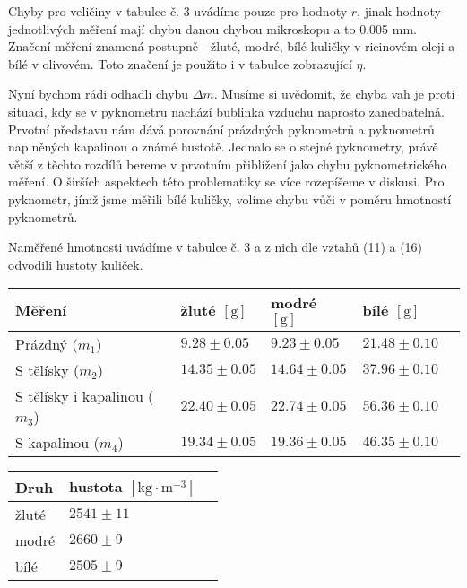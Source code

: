 \documentclass[a4paper]{article}
\begin{document}
\par Chyby pro veličiny v tabulce č. 3 uvádíme pouze pro hodnoty $r$, jinak hodnoty jednotlivých měření mají chybu danou chybou mikroskopu a to 0.005 mm. Značení měření znamená postupně - žluté, modré, bílé kuličky v ricinovém oleji a bílé v olivovém. Toto značení je použito i v tabulce zobrazující $\eta$.
\par Nyní bychom rádi odhadli chybu $\Delta m$. Musíme si uvědomit, že chyba vah je proti situaci, kdy se v pyknometru nachází bublinka vzduchu naprosto zanedbatelná. Prvotní představu nám dává porovnání prázdných pyknometrů a pyknometrů naplněných kapalinou o známé hustotě. Jednalo se o stejné pyknometry, právě větší z těchto rozdílů bereme v prvotním přiblížení jako chybu pyknometrického měření. O širších aspektech této problematiky se více rozepíšeme v diskusi. Pro pyknometr, jímž jsme měřili bílé kuličky, volíme chybu vůči v poměru hmotností pyknometrů.
\par Naměřené hmotnosti uvádíme v tabulce č. 3 a z nich dle vztahů (11) a (16) odvodili hustoty kuliček.
\begin{center}
     \label{tab:title}
    \begin{tabular}{ | l | l | l | l | p{5cm} |} \hline
    Měření & žluté $\mathrm{[g]}$ & modré $\mathrm{[g]}$ & bílé $\mathrm{[g]}$ \\ \hline
    Prázdný ($m_{1}$)     & $9.28\pm0.05$  & $9.23\pm0.05$  & $21.48\pm0.10$ \\ \hline
    S tělísky ($m_{2}$) & $14.35\pm0.05$ & $14.64\pm0.05$ & $37.96\pm0.10$ \\ \hline
    S tělísky i kapalinou ($m_{3}$) & $22.40\pm0.05$ & $22.74\pm0.05$ & $56.36\pm0.10$ \\ \hline
    S kapalinou ($m_{4}$) & $19.34\pm0.05$ & $19.36\pm0.05$ & $46.35\pm0.10$ \\ \hline
    \end{tabular}
\end{center}
\begin{center}
     \label{tab:title}
    \begin{tabular}{ | l | l | p{3cm} |} \hline
    Druh & hustota $\mathrm{[kg \cdot m^{-3}]}$ \\ \hline
    žluté & $2541\pm11$ \\ \hline
    modré & $2660\pm9$ \\ \hline
    bílé & $2505\pm9$  \\ \hline
    \end{tabular}
\end{center}
\end{document}
